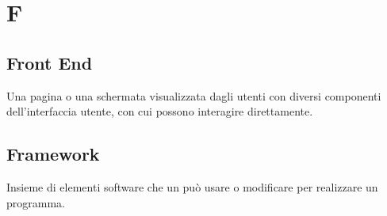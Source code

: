 \chapter{F}

\section{Front End}\label{sec:Front-end}
Una pagina o una schermata visualizzata dagli utenti con diversi componenti dell'interfaccia utente, con cui possono interagire direttamente.

\section{Framework}\label{sec:Frameworks}
Insieme di elementi software che un  può usare o modificare per realizzare un programma.
